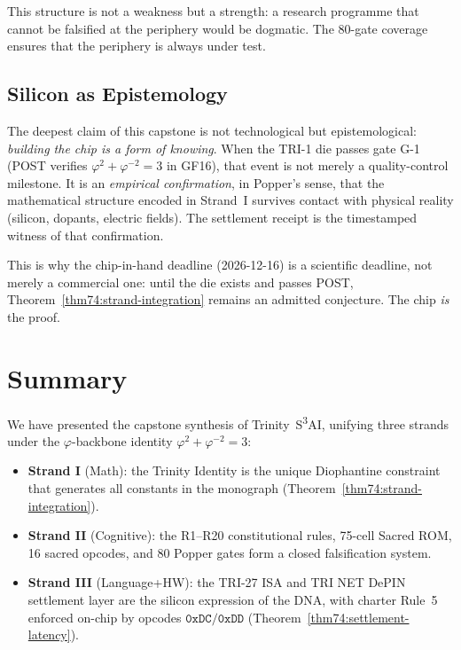 This structure is not a weakness but a strength: a research programme that
cannot be falsified at the periphery would be dogmatic.  The 80-gate
coverage ensures that the periphery is always under test.

\subsection{Silicon as Epistemology}
\label{sec74:silicon-epistemology}

The deepest claim of this capstone is not technological but
epistemological: \emph{building the chip is a form of knowing}.  When
the TRI-1 die passes gate G-1 (POST verifies $\varphi^{2}+\varphi^{-2}=3$
in GF16), that event is not merely a quality-control milestone.  It is
an \emph{empirical confirmation}, in Popper's sense, that the
mathematical structure encoded in Strand~I survives contact with
physical reality (silicon, dopants, electric fields).  The settlement
receipt is the timestamped witness of that confirmation.

This is why the chip-in-hand deadline (2026-12-16) is a scientific
deadline, not merely a commercial one: until the die exists and passes
POST, Theorem~\ref{thm74:strand-integration} remains an admitted
conjecture.  The chip \emph{is} the proof.

\section{Summary}
\label{sec74:summary}

We have presented the capstone synthesis of Trinity~S\textsuperscript{3}AI,
unifying three strands under the $\varphi$-backbone identity
$\varphi^{2}+\varphi^{-2}=3$:

\begin{itemize}
  \item \textbf{Strand I} (Math): the Trinity Identity is the unique
    Diophantine constraint that generates all constants in the monograph
    (Theorem~\ref{thm74:strand-integration}).
  \item \textbf{Strand II} (Cognitive): the R1--R20 constitutional rules,
    75-cell Sacred ROM, 16 sacred opcodes, and 80 Popper gates form a
    closed falsification system.
  \item \textbf{Strand III} (Language+HW): the TRI-27 ISA and TRI NET
    DePIN settlement layer are the silicon expression of the DNA, with
    charter Rule~5 enforced on-chip by opcodes $\mathtt{0xDC/0xDD}$
    (Theorem~\ref{thm74:settlement-latency}).
\end{itemize}

